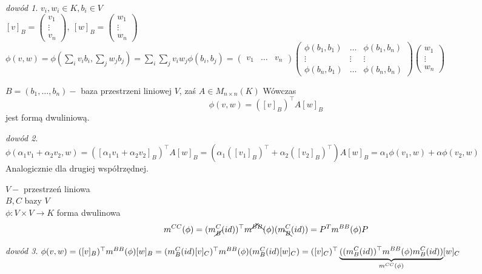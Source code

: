 \documentclass[10pt]{article}
\theoremstyle{definition}
\theoremstyle{definition}
\theoremstyle{definition}
\theoremstyle{definition}
\theoremstyle{remark}
\newtheorem*{dd}{dowód}
\theoremstyle{definition}
\theoremstyle{definition}
\theoremstyle{definition}
\theoremstyle{definition}
\theoremstyle{definition}
\begin{document}
\begin{dd} $v_i,w_i \in K, b_i \in V$ \\ 
    $[v]_B = \begin{pmatrix} v_1 \\ \vdots \\ v_n \end{pmatrix},\ 
     [w]_B = \begin{pmatrix} w_1 \\ \vdots \\ w_n \end{pmatrix}$ \\ 
    $\phi(v,w) = \phi( \sum\limits_i v_i b_i, \sum\limits_j w_j b_j) = 
    \sum\limits_i \sum\limits_j v_i w_j \phi (b_i,b_j) = 
    \begin{pmatrix} v_1 &\dots& v_n \end{pmatrix}
    \begin{pmatrix} \phi(b_1,b_1) & \dots & \phi(b_1,b_n) \\ 
                    \vdots & \vdots & \vdots \\ 
                \phi(b_n,b_1) & \dots & \phi(b_n,b_n) \end{pmatrix}
    \begin{pmatrix} w_1 \\ \vdots \\ w_n \end{pmatrix}$
\end{dd}
\begin{ft} 
    $B = (b_1,\ldots,b_n) - $ baza przestrzeni liniowej $V$, zaś $A \in M_{n \times n}(K)$
    Wówczas \[ \phi(v,w) = ([v]_B)^\top A [w]_B\] jest formą dwuliniową.
\end{ft} 
\begin{dd} ~\\ 
    $\phi(\alpha_1 v_1 + \alpha_2 v_2,w) = ([\alpha_1 v_1+\alpha_2 v_2]_B)^\top 
    A[w]_B = (\alpha_1([v_1]_B)^\top + \alpha_2([v_2]_B)^\top)A [w]_B = 
    \alpha_1 \phi(v_1,w) + \alpha \phi(v_2,w)$ Analogicznie dla drugiej współrzędnej. 
\end{dd} 
\begin{ft} 
    $V - $ przestrzeń liniowa \\ 
    $B, C $ bazy $V$ \\ 
    $\phi: V \times V \to K$ forma dwulinowa 
    \[ m^{CC} (\phi) = (m_{\cancel{B}}^C(id))^\top m^{\cancel{B}\bcancel{B}}
    (\phi) (m_{\bcancel{B}}^C(id)) = P^T m^{BB}(\phi) P\]
\end{ft} 
\begin{dd} 
    $\phi (v,w) = ([v]_B)^\top m^{BB}(\phi) [w]_B = (m_B^C(id)[v]_C)^\top m^{BB}(\phi) 
    (m_B^C(id)[w]_C) = \\ ([v]_C)^\top 
    \underbrace{((m_B^C (id))^\top m^{BB}(\phi) m_B^C(id))}_{m^{CC}(\phi)} [w]_C$
\end{dd} 
\end{document}
